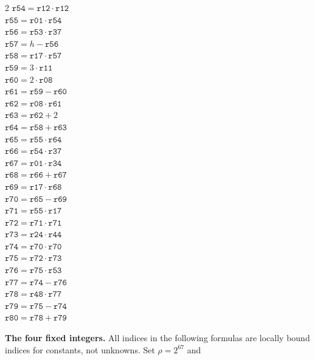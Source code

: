 \documentclass[10pt]{article}
\begin{document}
\begin{multicols}{2}
\(\mathtt{r54} = \mathtt{r12} \cdot \mathtt{r12}\)\\
\(\mathtt{r55} = \mathtt{r01} \cdot \mathtt{r54}\)\\
\(\mathtt{r56} = \mathtt{r53} \cdot \mathtt{r37}\)\\
\(\mathtt{r57} = h - \mathtt{r56}\)\\
\(\mathtt{r58} = \mathtt{r17} \cdot \mathtt{r57}\)\\
\(\mathtt{r59} = 3 \cdot \mathtt{r11}\)\\
\(\mathtt{r60} = 2 \cdot \mathtt{r08}\)\\
\(\mathtt{r61} = \mathtt{r59} - \mathtt{r60}\)\\
\(\mathtt{r62} = \mathtt{r08} \cdot \mathtt{r61}\)\\
\(\mathtt{r63} = \mathtt{r62} + 2\)\\
\(\mathtt{r64} = \mathtt{r58} + \mathtt{r63}\)\\
\(\mathtt{r65} = \mathtt{r55} \cdot \mathtt{r64}\)\\
\(\mathtt{r66} = \mathtt{r54} \cdot \mathtt{r37}\)\\
\(\mathtt{r67} = \mathtt{r01} \cdot \mathtt{r34}\)\\
\(\mathtt{r68} = \mathtt{r66} + \mathtt{r67}\)\\
\(\mathtt{r69} = \mathtt{r17} \cdot \mathtt{r68}\)\\
\(\mathtt{r70} = \mathtt{r65} - \mathtt{r69}\)\\
\(\mathtt{r71} = \mathtt{r55} \cdot \mathtt{r17}\)\\
\(\mathtt{r72} = \mathtt{r71} \cdot \mathtt{r71}\)\\
\(\mathtt{r73} = \mathtt{r24} \cdot \mathtt{r44}\)\\
\(\mathtt{r74} = \mathtt{r70} \cdot \mathtt{r70}\)\\
\(\mathtt{r75} = \mathtt{r72} \cdot \mathtt{r73}\)\\
\(\mathtt{r76} = \mathtt{r75} \cdot \mathtt{r53}\)\\
\(\mathtt{r77} = \mathtt{r74} - \mathtt{r76}\)\\
\(\mathtt{r78} = \mathtt{r48} \cdot \mathtt{r77}\)\\
\(\mathtt{r79} = \mathtt{r75} - \mathtt{r74}\)\\
\(\mathtt{r80} = \mathtt{r78} + \mathtt{r79}\)\\
\end{multicols}
\clearpage
\textbf{The four fixed integers.} All indices in the following formulas are
locally bound indices for constants, not unknowns. Set \(\rho=2^{67}\) and
\end{document}

